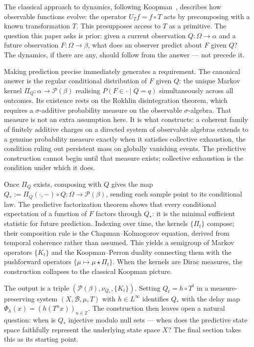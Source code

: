 The classical approach to dynamics, following Koopman~\cite{Koopman1931},
describes how observable functions evolve: the operator $U_T f = f \circ T$
acts by precomposing with a known transformation $T$.  This presupposes access
to $T$ as a primitive.  The question this paper asks is prior: given a current
observation $Q : \Omega \to \alpha$ and a future observation $F : \Omega \to
\beta$, what does an observer predict about $F$ given $Q$?  The dynamics, if
there are any, should follow from the answer — not precede it.

Making prediction precise immediately generates a requirement.  The canonical
answer is the regular conditional distribution of $F$ given $Q$: the unique
Markov kernel $\Pi_Q : \alpha \to \mathcal{P}(\beta)$ realising
$P(F \in \cdot \mid Q = q)$ simultaneously across all outcomes.  Its existence
rests on the Rokhlin disintegration theorem, which requires a $\sigma$-additive
probability measure on the observable $\sigma$-algebra.  That measure is not an
extra assumption here.  It is what \cite{mahon_paper1} constructs: a coherent
family of finitely additive charges on a directed system of observable algebras
extends to a genuine probability measure exactly when it satisfies collective
exhaustion, the condition ruling out persistent mass on globally vanishing
events.  The predictive construction cannot begin until that measure exists;
collective exhaustion is the condition under which it does.

Once $\Pi_Q$ exists, composing with $Q$ gives the map
$Q_* := \Pi_Q(\cdot, -) \circ Q : \Omega \to \mathcal{P}(\beta)$, sending each
sample point to its conditional law.  The predictive factorization theorem shows
that every conditional expectation of a function of $F$ factors through $Q_*$:
it is the minimal sufficient statistic for future prediction.  Indexing over
time, the kernels $\{\Pi_t\}$ compose; their composition rule is the
Chapman--Kolmogorov equation, derived from temporal coherence rather than
assumed.  This yields a semigroup of Markov operators $\{K_t\}$ and the
Koopman--Perron duality connecting them with the pushforward operators
$\{\mu \mapsto \mu \star \Pi_t\}$.  When the kernels are Dirac measures, the
construction collapses to the classical Koopman picture.

The output is a triple $(\mathcal{P}(\beta), \nu_{Q_*}, \{K_t\})$.
Setting $Q_t = h \circ T^t$ in a measure-preserving system
$(X, \mathcal{B}, \mu, T)$ with $h \in L^\infty$ identifies $Q_*$ with the
delay map $\Phi_h(x) = (h(T^n x))_{n \in \mathbb{Z}}$.  The construction then
leaves open a natural question: when is $Q_*$ injective modulo null sets — when
does the predictive state space faithfully represent the underlying state space
$X$?  The final section takes this as its starting point.

